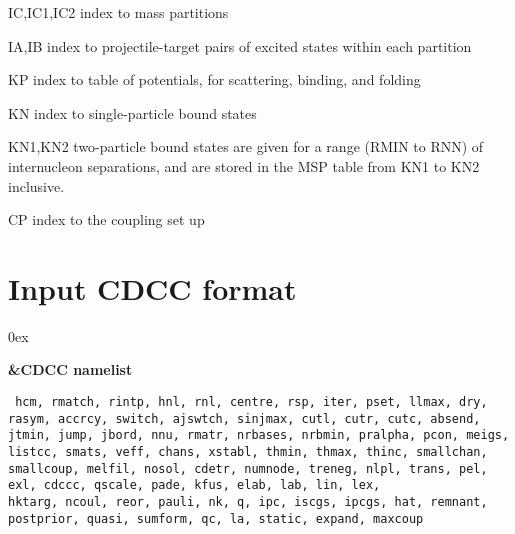 \documentclass[11pt]{article}
\begin{document}
IC,IC1,IC2    index to mass partitions

IA,IB         index to projectile-target pairs of excited states
              within each partition

KP            index to table of potentials, for scattering, binding,
              and folding

KN            index to single-particle bound states

KN1,KN2       two-particle bound states are given for a range (RMIN to
              RNN) of internucleon separations, and are stored in the
              MSP table from KN1 to KN2 inclusive.

CP            index to the coupling set up

\newpage
\section{Input CDCC format}
\hangindent 0ex

{\bf \&CDCC namelist}

{\tt
hcm, rmatch, rintp, hnl, rnl, centre,  rsp, iter, pset, llmax,  dry,
rasym, accrcy, switch, ajswtch, sinjmax,  cutl, cutr, cutc,
absend, jtmin, jump, jbord, nnu,  rmatr, nrbases, nrbmin,  pralpha, pcon,  meigs,
listcc, smats, veff, chans, xstabl, thmin, thmax, thinc,
smallchan, smallcoup, melfil, nosol, cdetr, numnode, treneg,
nlpl, trans, pel, exl, cdccc, qscale, pade, kfus,
elab,  lab, lin, lex, \\
 hktarg, ncoul, reor, pauli,  nk,
q, ipc, iscgs, ipcgs,  hat, remnant, postprior, quasi,
sumform, qc, la, static, expand, maxcoup
}\\
\end{document}
